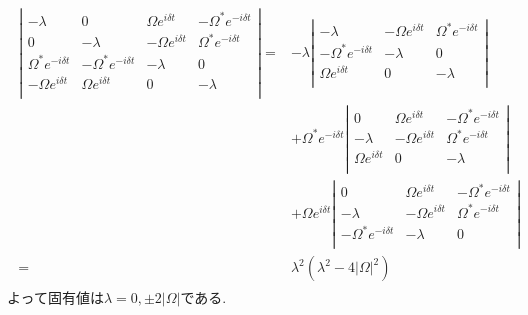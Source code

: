 \documentclass[uplatex,a4j,11pt,dvipdfmx]{jsarticle}
\begin{document}
\begin{align}
  \begin{split}
    \left|
    \begin{array}{cccc}
      -\lambda&0&\Omega e^{i\delta t}&-\Omega^* e^{-i\delta t}\\
      0&-\lambda&-\Omega e^{i\delta t}&\Omega^* e^{-i\delta t}\\
      \Omega^* e^{-i\delta t}&-\Omega^* e^{-i\delta t}&-\lambda&0\\
      -\Omega e^{i\delta t}&\Omega e^{i\delta t}&0&-\lambda\\
    \end{array}
    \right|
    =&-\lambda
    \left|
    \begin{array}{ccc}
      -\lambda&-\Omega e^{i\delta t}&\Omega^* e^{-i\delta t}\\
      -\Omega^* e^{-i\delta t}&-\lambda&0\\
      \Omega e^{i\delta t}&0&-\lambda\\
    \end{array}
    \right|\\
    &+\Omega^* e^{-i\delta t}
    \left|
    \begin{array}{cccc}
      0&\Omega e^{i\delta t}&-\Omega^* e^{-i\delta t}\\
      -\lambda&-\Omega e^{i\delta t}&\Omega^* e^{-i\delta t}\\
      \Omega e^{i\delta t}&0&-\lambda\\
    \end{array}
    \right|\\
    &+\Omega e^{i\delta t}
    \left|
    \begin{array}{cccc}
      0&\Omega e^{i\delta t}&-\Omega^* e^{-i\delta t}\\
      -\lambda&-\Omega e^{i\delta t}&\Omega^* e^{-i\delta t}\\
      -\Omega^* e^{-i\delta t}&-\lambda&0\\
    \end{array}
    \right|\\
    =&\lambda^2(\lambda^2-4|\Omega|^2)
  \end{split}
\end{align}
よって固有値は$\lambda=0,\pm2|\Omega|$である.
\newpage
\end{document}
